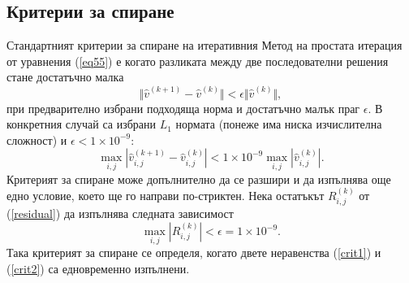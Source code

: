 \documentclass{article}
\newcommand{\rf}[1]{(\ref{#1})}
\begin{document}
\subsection{Критерии за спиране}
Стандартният критерии за спиране на итеративния Метод на простата итерация от уравнения \rf{eq55} е когато разликата между две последователни решения стане достатъчно малка
\begin{equation*}
\Vert \widehat{v}^{(k+1)}-\widehat{v}^{(k)}\Vert  < \epsilon \Vert \widehat{v}^{(k)}\Vert ,
\end{equation*}
при предварително избрани подходяща норма и достатъчно малък праг $\epsilon$. В конкретния случай са избрани $L_1$ нормата (понеже има ниска изчислителна сложност) и $\epsilon < 1\times10^{-9}$:
\begin{equation}\label{crit1}
\max_{i,j} |\widehat{v}^{(k+1)}_{i,j}-\widehat{v}^{(k)}_{i,j}| < 1\times10^{-9} \max_{i,j} |\widehat{v}^{(k)}_{i,j}|.
\end{equation}
Критерият за спиране може допълнително да се разшири и да изпълнява още едно условие, което ще го направи по-стриктен. Нека остатъкът $R_{i,j}^{(k)}$ от \rf{residual} да изпълнява следната зависимост
\begin{equation}\label{crit2}
\max_{i,j} |R_{i,j}^{(k)}| < \epsilon = 1\times10^{-9}.
\end{equation}
Така критерият за спиране се определя, когато двете неравенства \rf{crit1} и \rf{crit2} са едновременно изпълнени.
\end{document}
